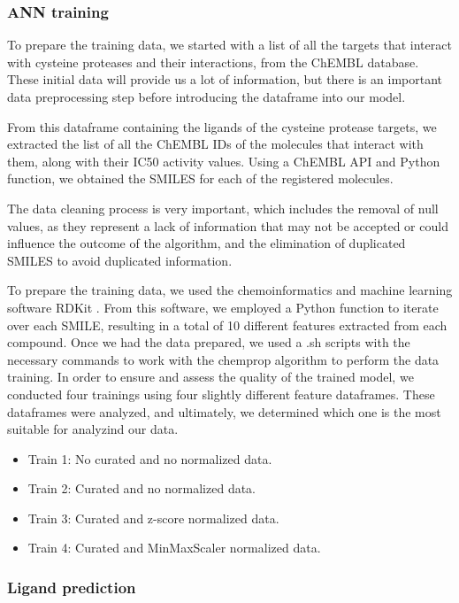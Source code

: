 \documentclass[final,times,twocolumn,article]{elsarticle}
\begin{document}
\subsubsection{ANN training}

To prepare the training data, we started with a list of all the targets that interact with cysteine proteases and their interactions, from the ChEMBL database. These initial data will provide us a lot of information, but there is an important data preprocessing step before introducing the dataframe into our model. 

From this dataframe containing the ligands of the cysteine protease targets, we extracted the list of all the ChEMBL IDs of the molecules that interact with them, along with their IC50 activity values. Using a ChEMBL API and Python function, we obtained the SMILES for each of the registered molecules. 

The data cleaning process is very important, which includes the removal of null values, as they represent a lack of information that may not be accepted or could influence the outcome of the algorithm, and the elimination of duplicated SMILES to avoid duplicated information. 

To prepare the training data, we used the chemoinformatics and machine learning software RDKit \cite{rdkitweb}. From this software, we employed a Python function to iterate over each SMILE, resulting in a total of 10 different features extracted from each compound. Once we had the data prepared, we used a .sh scripts with the necessary commands to work with the chemprop algorithm to perform the data training. 
In order to ensure and assess the quality of the trained model, we conducted four trainings using four slightly different feature dataframes. These dataframes were analyzed, and ultimately, we determined which one is the most suitable for analyzind our data. 

\begin{itemize}
\item Train 1: No curated and no normalized data.
\item Train 2: Curated and no normalized data.
\item Train 3: Curated and z-score normalized data.
\item Train 4: Curated and MinMaxScaler normalized data.
\end{itemize}
\subsubsection{Ligand prediction}
\end{document}
